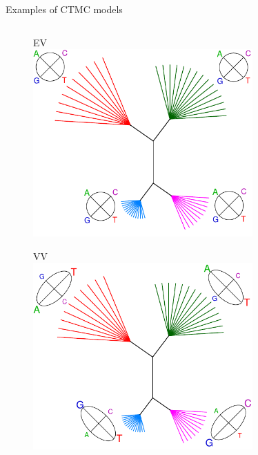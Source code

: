 \documentclass{beamer}
\begin{document}
\begin{frame}{Examples of CTMC models}
\begin{columns}
\begin{column}{0.5\textwidth}
  \begin{figure}
  \begin{center}
  EV\\
    \includegraphics[width=0.75\textwidth]{./graph/tree_EV}

  \vspace{0.2cm}
  VV\\
    \includegraphics[width=0.75\textwidth]{./graph/tree_VV}
  \end{center}
  \end{figure}
\end{column}

\end{columns}

\end{frame}
\end{document}

